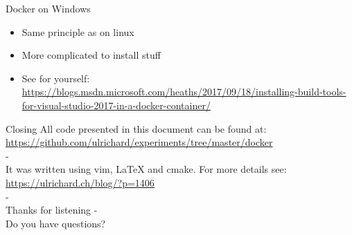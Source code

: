 \documentclass[11pt, aspectratio=169]{beamer}
\begin{document}
\begin{frame}{Docker on Windows} 
\begin{itemize}
\item Same principle as on linux
\item More complicated to install stuff
\item See for yourself: \url{https://blogs.msdn.microsoft.com/heaths/2017/09/18/installing-build-tools-for-visual-studio-2017-in-a-docker-container/}
\end{itemize}
\end{frame}

\begin{frame}{Closing}
All code presented in this document can be found at:\\
\url{https://github.com/ulrichard/experiments/tree/master/docker}\\
-\\
It was written using vim, LaTeX and cmake. For more details see:\\
\url{https://ulrichard.ch/blog/?p=1406}\\
-\\
Thanks for listening
-\\
Do you have questions?
\end{frame}
\end{document}
